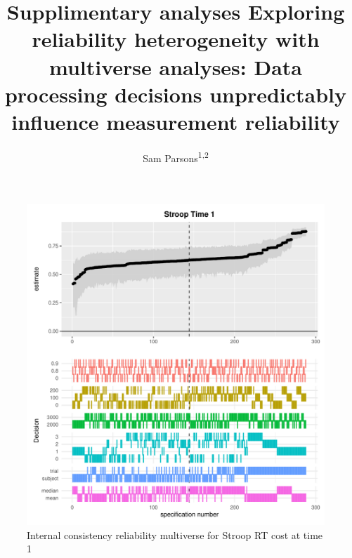 \documentclass[
  english,
  man,floatsintext]{apa6}
\title{Supplimentary analyses Exploring reliability heterogeneity with multiverse analyses: Data processing decisions unpredictably influence measurement reliability}
\author{Sam Parsons\textsuperscript{1,2}}
\date{}
\affiliation{\vspace{0.5cm}\textsuperscript{1} University of Oxford\\\textsuperscript{2} Radboud University Medical Center}
\begin{document}
\maketitle

\begin{figure}
\centering
\includegraphics{half_trials_files/figure-latex/unnamed-chunk-1-1.pdf}
\caption{\label{fig:unnamed-chunk-1}Internal consistency reliability multiverse for Stroop RT cost at time 1}
\end{figure}
\end{document}
